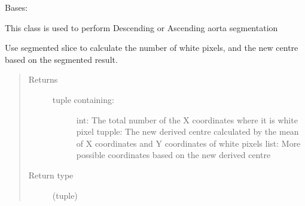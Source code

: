 \documentclass[letterpaper,10pt,english]{sphinxmanual}
\begin{document}
\begin{fulllineitems}
\label{\detokenize{AortaGeomReconDisplayModuleLib:AortaSegmenter.AortaSegmenter}}
\sphinxAtStartPar
Bases: 

\sphinxAtStartPar
This class is used to perform Descending or Ascending aorta segmentation

\begin{fulllineitems}
\label{\detokenize{AortaGeomReconDisplayModuleLib:AortaSegmenter.AortaSegmenter.__count_pixel_asc}}
\sphinxAtStartPar
Use segmented slice to calculate the number of white pixels,
and the new centre based on the segmented result.
\begin{quote}\begin{description}
\item[{Returns}] \leavevmode
\sphinxAtStartPar
\begin{description}
\item[{tuple containing:}] \leavevmode
\sphinxAtStartPar
int: The total number of the X coordinates where it is white pixel
tupple: The new derived centre calculated by the mean of X coordinates and Y coordinates of white pixels
list: More possible coordinates based on the new derived centre

\end{description}


\item[{Return type}] \leavevmode
\sphinxAtStartPar
(tuple)

\end{description}\end{quote}

\end{fulllineitems}


\end{fulllineitems}
\end{document}
